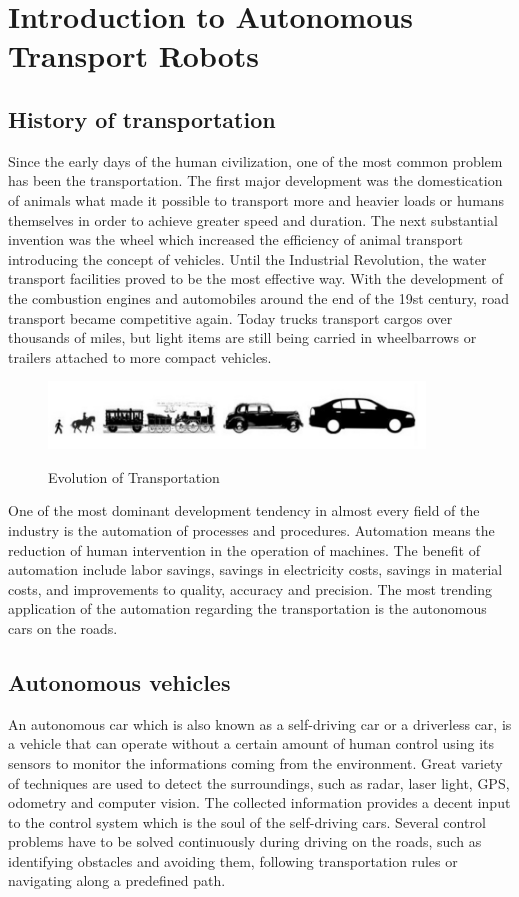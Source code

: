 \documentclass[12pt,english]{article}
\begin{document}
\section{Introduction to Autonomous Transport Robots}
\subsection{History of transportation}

Since the early days of the human civilization, one of the most common problem has been the transportation. The first major development was the domestication of animals what made it possible to transport more and heavier loads or humans themselves in order to achieve greater speed and duration. The next substantial invention was the wheel which increased the efficiency of animal transport introducing the concept of vehicles. Until the Industrial Revolution, the water transport facilities proved to be the most effective way. With the development of the combustion engines and automobiles around the end of the 19st century, road transport became competitive again. Today trucks transport cargos over thousands of miles, but light items are still being carried in wheelbarrows or trailers attached to more compact vehicles. 

\begin{figure}[h]
	\centering
	\includegraphics[width=10cm]{figures/evot}
	\label{fig1}
	\caption{Evolution of Transportation}
\end{figure}

\noindent One of the most dominant development tendency in almost every field of the industry is the automation of processes and procedures. Automation means the reduction of human intervention in the operation of machines. The benefit of automation include labor savings, savings in electricity costs, savings in material costs, and improvements to quality, accuracy and precision. The most trending application of the automation regarding the transportation is the autonomous cars on the roads. 
\subsection{Autonomous vehicles}
An autonomous car which is also known as a self-driving car or a driverless car, is a vehicle that can operate without a certain amount of human control using its sensors to monitor the informations coming from the environment. Great variety of techniques are used to detect the surroundings, such as radar, laser light, GPS, odometry and computer vision. The collected information provides a decent input to the control system which is the soul of the self-driving cars. Several control problems have to be solved continuously during driving on the roads, such as identifying obstacles and avoiding them, following transportation rules or navigating along a predefined path.
\end{document}
